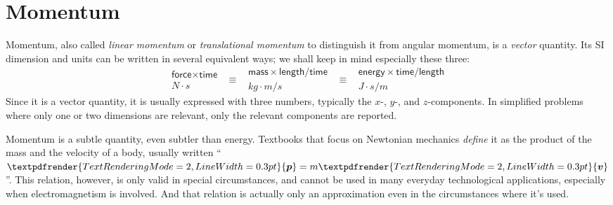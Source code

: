 \documentclass[a4paper,12pt,%
onecolumn,oneside,titlepage,%
british%
]{memoir}
\renewcommand*{\bm}[1]{\textpdfrender{TextRenderingMode=2,LineWidth=0.3pt}{\boldsymbol{#1}}}
\newcommand{\mynotew}[1]{{\footnotesize\color{midgrey}\faIcon{tools}\ #1}}
\renewcommand*{\|}[1][]{\nonscript\:#1\vert\nonscript\:\mathopen{}}
\begin{document}
\section{Momentum}
\label{sec:intro_momentum}

Momentum, also called \emph{linear momentum} or \emph{translational momentum} to distinguish it from angular momentum, is a \emph{vector} quantity. Its SI dimension and units can be written in several equivalent ways; we shall keep in mind especially these three:
\begin{equation*}
  \begin{gathered}
    \textsf{force}\times\textsf{time}
    \\\unit{N\cdot s}
  \end{gathered}
\enspace  \equiv\enspace
  \begin{gathered}
  \textsf{mass}\times\textsf{length}/\textsf{time}
    \\\unit{kg\cdot m/s}
  \end{gathered}
\enspace  \equiv\enspace
  \begin{gathered}
  \textsf{energy}\times\textsf{time}/\textsf{length}
    \\\unit{J\cdot s/m}
  \end{gathered}
\end{equation*}
Since it is a vector quantity, it is usually expressed with three numbers, typically the $x$-, $y$-, and $z$-components. In simplified problems where only one or two dimensions are relevant, only the relevant components are reported.

Momentum is a subtle quantity, even subtler than energy. Textbooks that focus on Newtonian mechanics \emph{define} it as the product of the mass and the velocity of a body, usually written \enquote{$\bm{p}=m\bm{v}$}. This relation, however, is only valid in special circumstances, and cannot be used in many everyday technological applications, especially when electromagnetism is involved. And that relation is actually only an approximation even in the circumstances where it's used.

\end{document}

